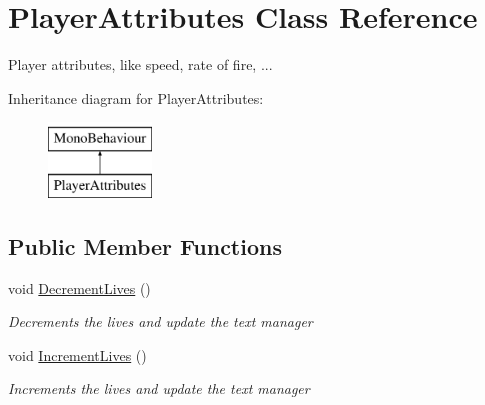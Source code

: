 \hypertarget{class_player_attributes}{}\section{Player\+Attributes Class Reference}
\label{class_player_attributes}


Player attributes, like speed, rate of fire, ...  


Inheritance diagram for Player\+Attributes\+:\begin{figure}[H]
\begin{center}
\leavevmode
\includegraphics[height=2.000000cm]{class_player_attributes}
\end{center}
\end{figure}
\subsection*{Public Member Functions}
\begin{DoxyCompactItemize}
\item 
void \mbox{\hyperlink{class_player_attributes_ae04bfec3ffddefb521aca753c9b832ea}{Decrement\+Lives}} ()
\begin{DoxyCompactList}\small\item\em Decrements the lives and update the text manager \end{DoxyCompactList}\item 
void \mbox{\hyperlink{class_player_attributes_a0dfec30b6ea5d4246790c1038c6e4c45}{Increment\+Lives}} ()
\begin{DoxyCompactList}\small\item\em Increments the lives and update the text manager \end{DoxyCompactList}\end{DoxyCompactItemize}
